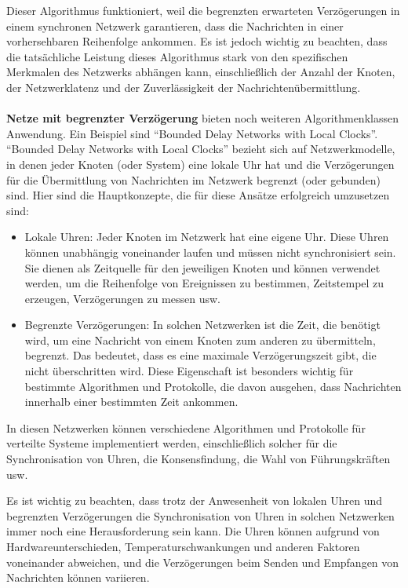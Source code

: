 Dieser Algorithmus funktioniert, weil die begrenzten erwarteten Verzögerungen in einem synchronen Netzwerk garantieren, dass die Nachrichten in einer vorhersehbaren Reihenfolge ankommen. Es ist jedoch wichtig zu beachten, dass die tatsächliche Leistung dieses Algorithmus stark von den spezifischen Merkmalen des Netzwerks abhängen kann, einschließlich der Anzahl der Knoten, der Netzwerklatenz und der Zuverlässigkeit der Nachrichtenübermittlung.
\\\\
\textbf{Netze mit begrenzter Verzögerung} bieten noch weiteren Algorithmenklassen Anwendung. Ein Beispiel sind \enquote{Bounded Delay Networks with Local Clocks}. \enquote{Bounded Delay Networks with Local Clocks} bezieht sich auf Netzwerkmodelle, in denen jeder Knoten (oder System) eine lokale Uhr hat und die Verzögerungen für die Übermittlung von Nachrichten im Netzwerk begrenzt (oder gebunden) sind. Hier sind die Hauptkonzepte, die für diese Ansätze erfolgreich umzusetzen sind:
\begin{itemize}
\item Lokale Uhren: Jeder Knoten im Netzwerk hat eine eigene Uhr. Diese Uhren können unabhängig voneinander laufen und müssen nicht synchronisiert sein. Sie dienen als Zeitquelle für den jeweiligen Knoten und können verwendet werden, um die Reihenfolge von Ereignissen zu bestimmen, Zeitstempel zu erzeugen, Verzögerungen zu messen usw.
\item Begrenzte Verzögerungen: In solchen Netzwerken ist die Zeit, die benötigt wird, um eine Nachricht von einem Knoten zum anderen zu übermitteln, begrenzt. Das bedeutet, dass es eine maximale Verzögerungszeit gibt, die nicht überschritten wird. Diese Eigenschaft ist besonders wichtig für bestimmte Algorithmen und Protokolle, die davon ausgehen, dass Nachrichten innerhalb einer bestimmten Zeit ankommen.
\end{itemize}
In diesen Netzwerken können verschiedene Algorithmen und Protokolle für verteilte Systeme implementiert werden, einschließlich solcher für die Synchronisation von Uhren, die Konsensfindung, die Wahl von Führungskräften usw.

Es ist wichtig zu beachten, dass trotz der Anwesenheit von lokalen Uhren und begrenzten Verzögerungen die Synchronisation von Uhren in solchen Netzwerken immer noch eine Herausforderung sein kann. Die Uhren können aufgrund von Hardwareunterschieden, Temperaturschwankungen und anderen Faktoren voneinander abweichen, und die Verzögerungen beim Senden und Empfangen von Nachrichten können variieren.


